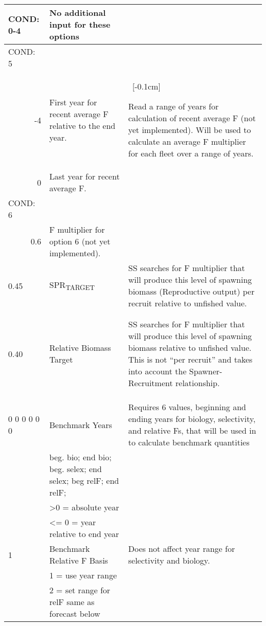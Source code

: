 \begin{landscape}
\begin{longtable}{p{3cm} p{7cm} p{11cm}}
 \hline  
 COND: 0-4 & No additional input for these options & \\
 
 \hline
 COND: 5 & & \\
 \multicolumn{1}{r}{-4}  & First year for recent average F relative to the end year. & \ \multirow{1}{1cm}[-0.1cm]{\parbox{11cm }{Read a range of years for calculation of recent average F (not yet implemented). Will be used to calculate an average F multiplier for each fleet over a range of years. } }\\
 \multicolumn{1}{r}{0}  & Last year for recent average F. & \\
 
 \hline
 COND: 6 & & \\
 \multicolumn{1}{r}{0.6} & F multiplier for option 6 (not yet implemented). & \\
 
 \hline
 0.45 & SPR\textsubscript{TARGET} &  \multirow{1}{1cm}[-0.1cm]{\parbox{11cm }{ SS searches for F multiplier that will produce this level of spawning biomass (Reproductive output) per recruit relative to unfished value.}} \\
 & & \\
 & & \\
 \pagebreak
 
 0.40 & Relative Biomass Target & \multirow{1}{1cm}[-0.1cm]{\parbox{11cm }{ SS searches for F multiplier that will produce this level of spawning biomass relative to unfished value.  This is not “per recruit” and takes into account the Spawner-Recruitment relationship.}} \\
  & & \\
  & & \\
  & & \\
  
 \hline
 0 0 0 0 0 0 & Benchmark Years & \multirow{1}{1cm}[-0.1cm]{\parbox{11cm }{ Requires 6 values, beginning and ending years for biology, selectivity, and relative Fs, that will be used in to calculate benchmark quantities}} \\
  & beg. bio; end bio; beg. selex; end selex; beg relF; end relF; & \\
  & >0 = absolute year & \\
  & <= 0 = year relative to end year & \\
  
  \hline
  1 & Benchmark Relative F Basis &  \multirow{1}{1cm}[-0.1cm]{\parbox{11cm }{ Does not affect year range for selectivity and biology.}} \\
    & 1 = use year range & \\
    & 2 = set range for relF same as forecast below & \\
    

\end{longtable}
\end{landscape}
